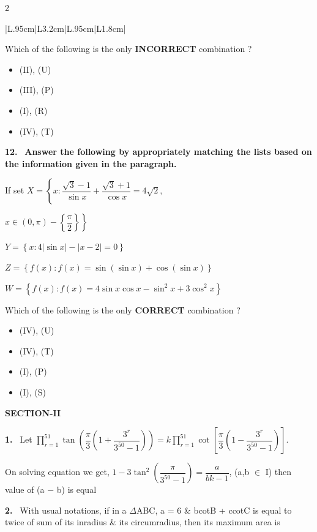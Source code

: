 \documentclass[10pt]{extarticle}
\newcommand{\sect}[1]{\par\smallskip\noindent\textbf{#1}\par}
\newcommand{\qn}[1]{\par\smallskip\noindent\textbf{#1.}~}
\newenvironment{qoptions}{\begin{itemize}[leftmargin=1.8em,itemsep=1pt,topsep=2pt,label={}]}{\end{itemize}}
\newcommand{\opt}[2]{\item[(#1)] #2}
\begin{document}
\begin{multicols}{2}
{\begin{tabular}{|L{.95cm}|L{3.2cm}|L{.95cm}|L{1.8cm}|}
\end{tabular}}\par
Which of the following is the only \textbf{INCORRECT} combination ?
\begin{qoptions}
\opt{A}{(II), (U)}
\opt{B}{(III), (P)}
\opt{C}{(I), (R)}
\opt{D}{(IV), (T)}
\end{qoptions}
\qn{12} \textbf{Answer the following by appropriately matching the lists based on the information given in the paragraph.}\par
If set $X=\left\{x:\dfrac{\sqrt3-1}{\sin x}+\dfrac{\sqrt3+1}{\cos x}=4\sqrt2,\right.$\par $\left.x\in(0,\pi)-\left\{\dfrac\pi2\right\}\right\}$\par
$Y=\left\{x:4|\sin x|-|x-2|=0\right\}$\par
$Z=\left\{f(x):f(x)=\sin(\sin x)+\cos(\sin x)\right\}$\par
$W=\left\{f(x):f(x)=4\sin x\cos x-\sin^2x+3\cos^2x\right\}$\par
\smallskip
{}\par
Which of the following is the only \textbf{CORRECT} combination ?
\begin{qoptions}
\opt{A}{(IV), (U)}
\opt{B}{(IV), (T)}
\opt{C}{(I), (P)}
\opt{D}{(I), (S)}
\end{qoptions}
\sect{SECTION-II}
\qn{1} Let $\displaystyle\prod_{r=1}^{51}\tan\left(\dfrac\pi3\left(1+\dfrac{3^r}{3^{50}-1}\right)\right)=k\prod_{r=1}^{51}\cot\left[\dfrac\pi3\left(1-\dfrac{3^r}{3^{50}-1}\right)\right]$.\par
On solving equation we get, $1-3\tan^2\left(\dfrac\pi{3^{50}-1}\right)=\dfrac{a}{bk-1}$, (a,b $\in$ I) then value of (a $-$ b) is equal
\qn{2} With usual notations, if in a $\Delta$ABC, a = 6 \& bcotB + ccotC is equal to twice of sum of its inradius \& its circumradius, then its maximum area is

\end{multicols}
\end{document}
